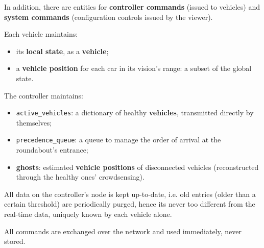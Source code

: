 In addition, there are entities for \textbf{controller commands} (issued to
vehicles) and \textbf{system commands} (configuration controls issued by the
viewer).

Each vehicle maintains:
\begin{itemize}
  \item its \textbf{local state}, as a \textbf{vehicle};
  \item a \textbf{vehicle position} for each car in its vision's range: a subset
  of the global state.
\end{itemize}

The controller maintains:
\begin{itemize}
  \item \texttt{active\_vehicles}: a dictionary of healthy \textbf{vehicles},
  transmitted directly by themselves;
  \item \texttt{precedence\_queue}: a queue to manage the order of arrival at the
  roundabout's entrance;
  \item \textbf{ghosts}: estimated \textbf{vehicle positions} of disconnected
  vehicles (reconstructed through the healthy ones' crowdsensing).
\end{itemize}

All data on the controller's node is kept up-to-date, i.e. old entries (older
than a certain threshold) are periodically purged, hence its never too different
from the real-time data, uniquely known by each vehicle alone.

All commands are exchanged over the network and used immediately, never stored.


